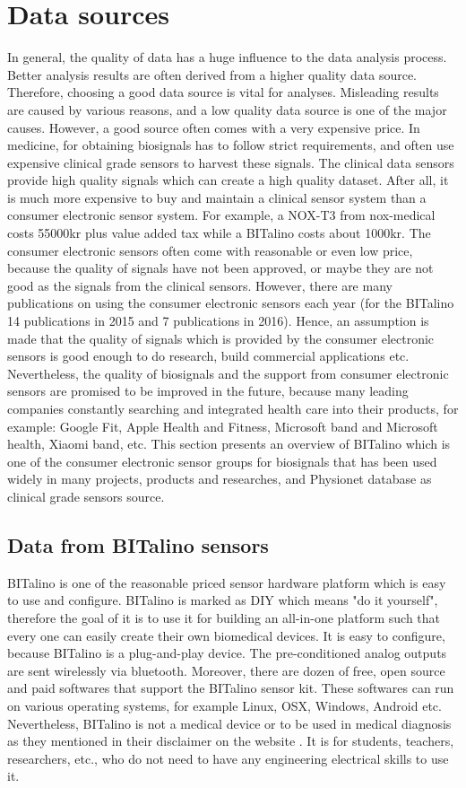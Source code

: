 \section{Data sources}
    In general, the quality of data has a huge influence to the data analysis process. Better analysis results are often derived from a higher quality data source. Therefore, choosing a good data source is vital for analyses. Misleading results are caused by various reasons, and a low quality data source is one of the major causes. However, a good source often comes with a very expensive price. In medicine, for obtaining biosignals has to follow strict requirements, and often use expensive clinical grade sensors to harvest these signals. The clinical data sensors provide high quality signals which can create a high quality dataset. After all, it is much more expensive to buy and maintain a clinical sensor system than a consumer electronic sensor system. For example, a NOX-T3 from nox-medical costs 55000kr plus value added tax\cite{Thomas} while a BITalino costs about 1000kr. The consumer electronic sensors often come with reasonable or even low price, because the quality of signals have not been approved, or maybe they are not good as the signals from the clinical sensors. However, there are many publications on using the consumer electronic sensors each year (for the BITalino 14 publications in 2015 and 7 publications in 2016\cite{BITalinoPubs}). Hence, an assumption is made that the quality of signals which is provided by the consumer electronic sensors is good enough to do research, build commercial applications etc. Nevertheless, the quality of biosignals and the support from consumer electronic sensors are promised to be improved in the future, because many leading companies constantly searching and integrated health care into their products, for example: Google Fit, Apple Health and Fitness, Microsoft band and Microsoft health, Xiaomi band, etc. This section presents an overview of BITalino which is one of the consumer electronic sensor groups for biosignals that has been used widely in many projects, products and researches, and Physionet database as clinical grade sensors source.
    \subsection{Data from BITalino sensors}
        BITalino is one of the reasonable priced sensor hardware platform which is easy to use and configure. BITalino is marked as DIY which means "do it yourself", therefore the goal of it is to use it for building an all-in-one platform such that every one can easily create their own biomedical devices. It is easy to configure, because BITalino is a plug-and-play device. The pre-conditioned analog outputs are sent wirelessly via bluetooth. Moreover, there are dozen of free, open source and paid softwares that support the BITalino sensor kit. These softwares can run on various operating systems, for example Linux, OSX, Windows, Android etc. Nevertheless, BITalino is not a medical device or to be used in medical diagnosis as they mentioned in their disclaimer on the website \cite{BITalino}. It is for students, teachers, researchers, etc., who do not need to have any engineering electrical skills to use it.
